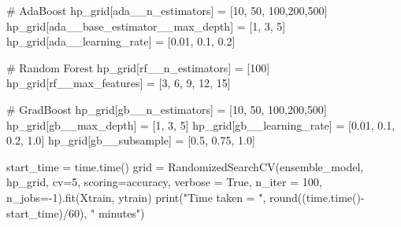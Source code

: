 \documentclass[
  letterpaper,
  DIV=11,
  numbers=noendperiod]{scrreprt}
\newenvironment{Shaded}{\begin{snugshade}}{\end{snugshade}}
\newcommand{\BuiltInTok}[1]{\textcolor[rgb]{0.00,0.23,0.31}{#1}}
\newcommand{\CommentTok}[1]{\textcolor[rgb]{0.37,0.37,0.37}{#1}}
\newcommand{\DecValTok}[1]{\textcolor[rgb]{0.68,0.00,0.00}{#1}}
\newcommand{\FloatTok}[1]{\textcolor[rgb]{0.68,0.00,0.00}{#1}}
\newcommand{\NormalTok}[1]{\textcolor[rgb]{0.00,0.23,0.31}{#1}}
\newcommand{\OperatorTok}[1]{\textcolor[rgb]{0.37,0.37,0.37}{#1}}
\newcommand{\StringTok}[1]{\textcolor[rgb]{0.13,0.47,0.30}{#1}}
\newcommand{\VariableTok}[1]{\textcolor[rgb]{0.07,0.07,0.07}{#1}}
\begin{document}
\begin{Shaded}
\begin{Highlighting}[]
\CommentTok{\# AdaBoost}
\NormalTok{hp\_grid[}\StringTok{\textquotesingle{}ada\_\_n\_estimators\textquotesingle{}}\NormalTok{] }\OperatorTok{=}\NormalTok{ [}\DecValTok{10}\NormalTok{, }\DecValTok{50}\NormalTok{, }\DecValTok{100}\NormalTok{,}\DecValTok{200}\NormalTok{,}\DecValTok{500}\NormalTok{]}
\NormalTok{hp\_grid[}\StringTok{\textquotesingle{}ada\_\_base\_estimator\_\_max\_depth\textquotesingle{}}\NormalTok{] }\OperatorTok{=}\NormalTok{ [}\DecValTok{1}\NormalTok{, }\DecValTok{3}\NormalTok{, }\DecValTok{5}\NormalTok{]}
\NormalTok{hp\_grid[}\StringTok{\textquotesingle{}ada\_\_learning\_rate\textquotesingle{}}\NormalTok{] }\OperatorTok{=}\NormalTok{ [}\FloatTok{0.01}\NormalTok{, }\FloatTok{0.1}\NormalTok{, }\FloatTok{0.2}\NormalTok{]}

\CommentTok{\# Random Forest}
\NormalTok{hp\_grid[}\StringTok{\textquotesingle{}rf\_\_n\_estimators\textquotesingle{}}\NormalTok{] }\OperatorTok{=}\NormalTok{ [}\DecValTok{100}\NormalTok{]}
\NormalTok{hp\_grid[}\StringTok{\textquotesingle{}rf\_\_max\_features\textquotesingle{}}\NormalTok{] }\OperatorTok{=}\NormalTok{ [}\DecValTok{3}\NormalTok{, }\DecValTok{6}\NormalTok{, }\DecValTok{9}\NormalTok{, }\DecValTok{12}\NormalTok{, }\DecValTok{15}\NormalTok{]}

\CommentTok{\# GradBoost}
\NormalTok{hp\_grid[}\StringTok{\textquotesingle{}gb\_\_n\_estimators\textquotesingle{}}\NormalTok{] }\OperatorTok{=}\NormalTok{ [}\DecValTok{10}\NormalTok{, }\DecValTok{50}\NormalTok{, }\DecValTok{100}\NormalTok{,}\DecValTok{200}\NormalTok{,}\DecValTok{500}\NormalTok{]}
\NormalTok{hp\_grid[}\StringTok{\textquotesingle{}gb\_\_max\_depth\textquotesingle{}}\NormalTok{] }\OperatorTok{=}\NormalTok{ [}\DecValTok{1}\NormalTok{, }\DecValTok{3}\NormalTok{, }\DecValTok{5}\NormalTok{]}
\NormalTok{hp\_grid[}\StringTok{\textquotesingle{}gb\_\_learning\_rate\textquotesingle{}}\NormalTok{] }\OperatorTok{=}\NormalTok{ [}\FloatTok{0.01}\NormalTok{, }\FloatTok{0.1}\NormalTok{, }\FloatTok{0.2}\NormalTok{, }\FloatTok{1.0}\NormalTok{]}
\NormalTok{hp\_grid[}\StringTok{\textquotesingle{}gb\_\_subsample\textquotesingle{}}\NormalTok{] }\OperatorTok{=}\NormalTok{ [}\FloatTok{0.5}\NormalTok{, }\FloatTok{0.75}\NormalTok{, }\FloatTok{1.0}\NormalTok{]}

\NormalTok{start\_time }\OperatorTok{=}\NormalTok{ time.time()}
\NormalTok{grid }\OperatorTok{=}\NormalTok{ RandomizedSearchCV(ensemble\_model, hp\_grid, cv}\OperatorTok{=}\DecValTok{5}\NormalTok{, scoring}\OperatorTok{=}\StringTok{\textquotesingle{}accuracy\textquotesingle{}}\NormalTok{, verbose }\OperatorTok{=} \VariableTok{True}\NormalTok{,}
\NormalTok{                         n\_iter }\OperatorTok{=} \DecValTok{100}\NormalTok{, n\_jobs}\OperatorTok{={-}}\DecValTok{1}\NormalTok{).fit(Xtrain, ytrain)}
\BuiltInTok{print}\NormalTok{(}\StringTok{"Time taken = "}\NormalTok{, }\BuiltInTok{round}\NormalTok{((time.time()}\OperatorTok{{-}}\NormalTok{start\_time)}\OperatorTok{/}\DecValTok{60}\NormalTok{), }\StringTok{" minutes"}\NormalTok{)}
\end{Highlighting}
\end{Shaded}
\end{document}
